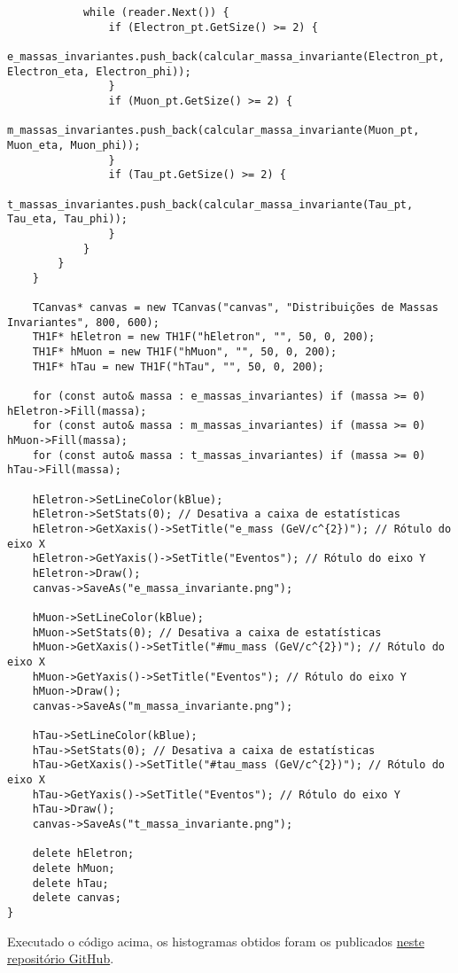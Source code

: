 \documentclass[a4 paper]{article}
\numberwithin{equation}{section}
\newcommand{\0}{\mathbf{0}}
\begin{document}
\begin{lstlisting}
            while (reader.Next()) {
                if (Electron_pt.GetSize() >= 2) {
                    e_massas_invariantes.push_back(calcular_massa_invariante(Electron_pt, Electron_eta, Electron_phi));
                }
                if (Muon_pt.GetSize() >= 2) {
                    m_massas_invariantes.push_back(calcular_massa_invariante(Muon_pt, Muon_eta, Muon_phi));
                }
                if (Tau_pt.GetSize() >= 2) {
                    t_massas_invariantes.push_back(calcular_massa_invariante(Tau_pt, Tau_eta, Tau_phi));
                }
            }
        }
    }

    TCanvas* canvas = new TCanvas("canvas", "Distribuições de Massas Invariantes", 800, 600);
    TH1F* hEletron = new TH1F("hEletron", "", 50, 0, 200);
    TH1F* hMuon = new TH1F("hMuon", "", 50, 0, 200);
    TH1F* hTau = new TH1F("hTau", "", 50, 0, 200);

    for (const auto& massa : e_massas_invariantes) if (massa >= 0) hEletron->Fill(massa);
    for (const auto& massa : m_massas_invariantes) if (massa >= 0) hMuon->Fill(massa);
    for (const auto& massa : t_massas_invariantes) if (massa >= 0) hTau->Fill(massa);

    hEletron->SetLineColor(kBlue);
    hEletron->SetStats(0); // Desativa a caixa de estatísticas
    hEletron->GetXaxis()->SetTitle("e_mass (GeV/c^{2})"); // Rótulo do eixo X
    hEletron->GetYaxis()->SetTitle("Eventos"); // Rótulo do eixo Y
    hEletron->Draw();
    canvas->SaveAs("e_massa_invariante.png");

    hMuon->SetLineColor(kBlue);
    hMuon->SetStats(0); // Desativa a caixa de estatísticas
    hMuon->GetXaxis()->SetTitle("#mu_mass (GeV/c^{2})"); // Rótulo do eixo X
    hMuon->GetYaxis()->SetTitle("Eventos"); // Rótulo do eixo Y
    hMuon->Draw();
    canvas->SaveAs("m_massa_invariante.png");

    hTau->SetLineColor(kBlue);
    hTau->SetStats(0); // Desativa a caixa de estatísticas
    hTau->GetXaxis()->SetTitle("#tau_mass (GeV/c^{2})"); // Rótulo do eixo X
    hTau->GetYaxis()->SetTitle("Eventos"); // Rótulo do eixo Y
    hTau->Draw();
    canvas->SaveAs("t_massa_invariante.png");

    delete hEletron;
    delete hMuon;
    delete hTau;
    delete canvas;
}

\end{lstlisting}

Executado o código acima, os histogramas obtidos foram os publicados \href{https://github.com/DiogoCaffonso/FAE\_Repo/tree/master/Trabalho5/Images}{neste repositório GitHub}.
\end{document}
